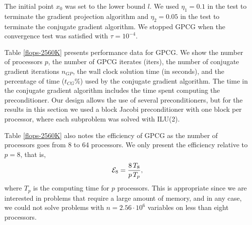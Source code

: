 The initial point $ x_0 $ was set to the lower bound $l$.
We used $\eta_1  = 0.1$ in the test  to terminate the gradient
projection algorithm and $\eta_2=0.05$ in the test
 to terminate the conjugate gradient algorithm.
We stopped GPCG when the convergence test 
 was satisfied with $ \tau = 10^{-4} $.

Table \ref{flops-2560K} presents performance data for
GPCG.
We show the number
of processors $p$,
the number of GPCG iterates (iters), the number of
conjugate gradient iterations $ n_{GP} $,
the wall clock solution time (in seconds),
and the percentage of time ($t_{CG}$\%) used by the conjugate
gradient algorithm.
The time in the conjugate gradient algorithm
includes the time spent
computing the preconditioner.
Our design allows the use of several preconditioners, but for the
results in this section we used a block Jacobi preconditioner
with one block per processor, where each subproblem was solved
with ILU(2).

Table \ref{flops-2560K} also notes the
efficiency of GPCG as the number of processors 
goes from 8 to 64 processors. We only present the
efficiency relative to $ p = 8 $, that is,
\[
{\cal E}_{8} = \frac {8 \, T_8} {p \, T_p} ,
\]
where $ T_p $ is the computing time for $p$ processors.
This is appropriate since we are interested in problems
that require a large amount of memory, and in any case,
we could not solve problems with $ n = 2.56 \cdot 10^6 $ variables
on less than eight processors.

